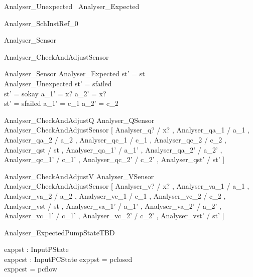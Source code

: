 \documentclass{article}
\begin{document}
\begin{zed}
	Analyser\_Unexpected ~\lnot Analyser\_Expected
\end{zed}

\begin{zed}
	Analyser\_SchInstRef\_0 
\end{zed}

\begin{zed}
	Analyser\_Sensor 
\end{zed}

\begin{schema}{Analyser\_CheckAndAdjustSensor}

 Analyser\_Sensor 
\where
 Analyser\_Expected \implies st' = st \\
 Analyser\_Unexpected \implies st' = sfailed \\
 st' = sokay \implies a\_1' = x? \land a\_2' = x? \\
 st' = sfailed \implies a\_1' = c\_1 \land a\_2' = c\_2
\end{schema}

\begin{zed}
	Analyser\_CheckAndAdjustQ  Analyser\_QSensor \land Analyser\_CheckAndAdjustSensor [ Analyser\_q? / x? , Analyser\_qa\_1 / a\_1 , Analyser\_qa\_2 / a\_2 , Analyser\_qc\_1 / c\_1 , Analyser\_qc\_2 / c\_2 , Analyser\_qst / st , Analyser\_qa\_1' / a\_1' , Analyser\_qa\_2' / a\_2' , Analyser\_qc\_1' / c\_1' , Analyser\_qc\_2' / c\_2' , Analyser\_qst' / st' ]
\end{zed}

\begin{zed}
	Analyser\_CheckAndAdjustV  Analyser\_VSensor \land Analyser\_CheckAndAdjustSensor [ Analyser\_v? / x? , Analyser\_va\_1 / a\_1 , Analyser\_va\_2 / a\_2 , Analyser\_vc\_1 / c\_1 , Analyser\_vc\_2 / c\_2 , Analyser\_vst / st , Analyser\_va\_1' / a\_1' , Analyser\_va\_2' / a\_2' , Analyser\_vc\_1' / c\_1' , Analyser\_vc\_2' / c\_2' , Analyser\_vst' / st' ]
\end{zed}

\begin{schema}{Analyser\_ExpectedPumpStateTBD}

 exppst : InputPState \\
 exppcst : InputPCState 
\where
 exppst = pclosed \\
 exppcst = pcflow
\end{schema}
\end{document}
